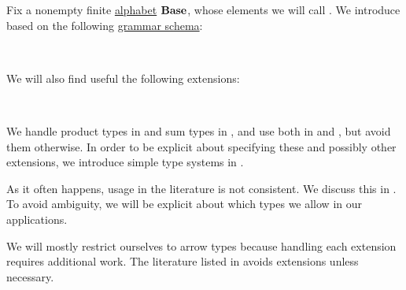 \begin{definition}\label{def:simple_type}\mimprovised
  Fix a nonempty finite \hyperref[def:formal_language/alphabet]{alphabet} \( \op*{Base} \), whose elements we will call . We introduce  based on the following \hyperref[def:formal_grammar/schema]{grammar schema}:
  \begin{bnf*}
       {\bnftsq{(} \bnfsp {} \bnfsp \bnftsq{\( \synimplies \)} \bnfsp {} \bnfsp \bnftsq{)}} \\
             { \bnfor {}}
  \end{bnf*}

  We will also find useful the following extensions:
  \begin{bnf*}
     {\bnftsq{(} \bnfsp {} \bnfsp \bnftsq{\( \syntimes \)} \bnfsp {} \bnfsp \bnftsq{)}} \\
         {\bnftsq{(} \bnfsp {} \bnfsp \bnftsq{\( \synplus \)} \bnfsp {} \bnfsp \bnftsq{)}}
  \end{bnf*}

  We handle product types in  and sum types in , and use both in  and , but avoid them otherwise. In order to be explicit about specifying these and possibly other extensions, we introduce simple type systems in .
\end{definition}
\begin{comments}
  \item As it often happens, usage in the literature is not consistent. We discuss this in . To avoid ambiguity, we will be explicit about which types we allow in our applications.

  \item We will mostly restrict ourselves to arrow types because handling each extension requires additional work. The literature listed in  avoids extensions unless necessary.
\end{comments}

